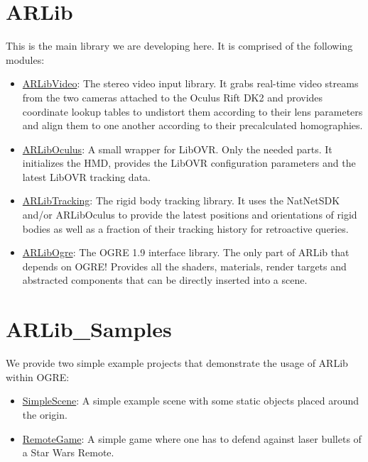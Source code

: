 \section{ARLib}\label{arlib}

This is the main library we are developing here. It is comprised of the
following modules:

\begin{itemize}
\item
  \hyperref[sec:video_library]{ARLibVideo}:
  The stereo video input library. It grabs real-time video streams from
  the two cameras attached to the Oculus Rift DK2 and provides
  coordinate lookup tables to undistort them according to their lens
  parameters and align them to one another according to their
  precalculated homographies.
\item
  \hyperref[sec:oculus_library]{ARLibOculus}:
  A small wrapper for LibOVR. Only the needed parts. It initializes the
  HMD, provides the LibOVR configuration parameters and the latest
  LibOVR tracking data.
\item
  \hyperref[sec:tracking_library]{ARLibTracking}:
  The rigid body tracking library. It uses the NatNetSDK and/or
  ARLibOculus to provide the latest positions and orientations of rigid
  bodies as well as a fraction of their tracking history for retroactive
  queries.
\item
  \hyperref[sec:ogre_library]{ARLibOgre}:
  The OGRE 1.9 interface library. The only part of ARLib that depends on
  OGRE! Provides all the shaders, materials, render targets and
  abstracted components that can be directly inserted into a scene.
\end{itemize}

\section{ARLib\_Samples}\label{arlibux5fsamples}

We provide two simple example projects that demonstrate the usage of
ARLib within OGRE:

\begin{itemize}
\item
  \hyperref[sec:simple_scene]{SimpleScene}:
  A simple example scene with some static objects placed around the
  origin.
\item
  \hyperref[sec:remote_game]{RemoteGame}:
  A simple game where one has to defend against laser bullets of a Star
  Wars Remote.
\end{itemize}